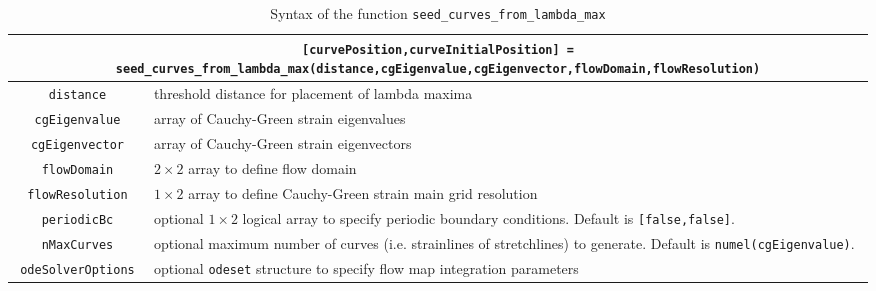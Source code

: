 \documentclass{article}
\begin{document}
\begin{table}
\begin{center}
\begin{tabular}{|c|p{}|}
\hline \hline
\multicolumn{2}{|p{\textwidth}|}{\lstinline![curvePosition,curveInitialPosition] = seed_curves_from_lambda_max(distance,cgEigenvalue,cgEigenvector,flowDomain,flowResolution)!}\\
\hline
\lstinline!distance! & threshold distance for placement of lambda maxima\\
\hline
\lstinline!cgEigenvalue! & array of Cauchy-Green strain eigenvalues\\
\hline
\lstinline!cgEigenvector! & array of Cauchy-Green strain eigenvectors\\
\hline
\lstinline!flowDomain! & $2 \times 2$ array to define flow domain\\
\hline
\lstinline!flowResolution! & $1 \times 2$ array to define Cauchy-Green strain main grid resolution\\
\hline
\lstinline!periodicBc! & optional $1 \times 2$ logical array to specify periodic boundary conditions. Default is \lstinline![false,false]!.\\
\hline
\lstinline!nMaxCurves! & optional maximum number of curves (i.e. strainlines of stretchlines) to generate. Default is \lstinline!numel(cgEigenvalue)!.\\
\hline
\lstinline!odeSolverOptions! & optional \lstinline!odeset! structure to specify flow map integration parameters\\
\hline \hline
\end{tabular}
\end{center}
\caption{Syntax of the function \lstinline!seed_curves_from_lambda_max!}
\label{t:seed_curves_from_lambda_max syntax}
\end{table}
\end{document}
